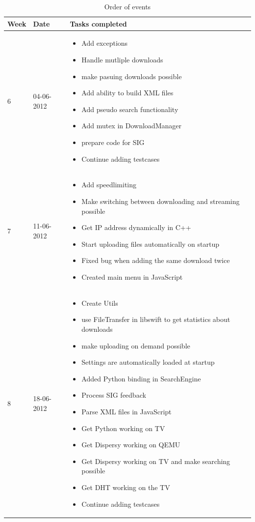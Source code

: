 \begin{table}
\centering
	\begin{tabular}{| l | l | p{8 cm} |}
		\hline
		Week & Date & Tasks completed \\
		\hline
		\hline
		6 & 04-06-2012 &		\begin{itemize}
								\item Add exceptions
								\item Handle mutliple downloads
								\item make pasuing downloads possible
								\item Add ability to build XML files
								\item Add pseudo search functionality
								\item Add mutex in DownloadManager
								\item prepare code for SIG
								\item Continue adding testcases
							\end{itemize} \\
		\hline
		7 & 11-06-2012 &		\begin{itemize}
								\item Add speedlimiting
								\item Make switching between downloading and streaming possible
								\item Get IP address dynamically in C++
								\item Start uploading files automatically on startup
								\item Fixed bug when adding the same download twice
								\item Created main menu in JavaScript
							\end{itemize} \\
		\hline
		8 & 18-06-2012 &		\begin{itemize}
								\item Create Utils
								\item use FileTransfer in libswift to get statistics about downloads
								\item make uploading on demand possible
								\item Settings are automatically loaded at startup
								\item Added Python binding in SearchEngine
								\item Process SIG feedback
								\item Parse XML files in JavaScript
								\item Get Python working on TV
								\item Get Dispersy working on QEMU
								\item Get Dispersy working on TV and make searching possible
								\item Get DHT working on the TV
								\item Continue adding testcases
							\end{itemize} \\
		\hline
\end{tabular}
\caption{Order of events}
\label{tab:planning2}
\end{table}

